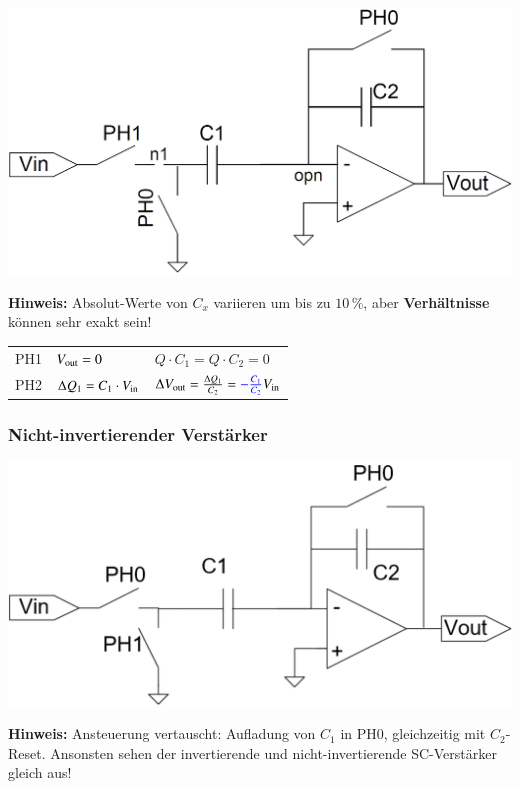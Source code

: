 \begin{minipage}[c]{0.4\columnwidth}
    \includegraphics[width=\columnwidth]{images/invertierender_sc_verstaerker.png}
\end{minipage}
\hfill
\begin{minipage}[c]{0.58\columnwidth}
    \textbf{Hinweis:} Absolut-Werte von $C_x$ variieren um bis zu $10 \, \% $, aber \textbf{Verhältnisse} können sehr exakt sein! 

    \begin{tabular}{@{}l l l@{}} 
        PH1   & $V_{\rm out} = 0$                   & $Q \cdot C_1 = Q \cdot C_2 = 0$ \\
        PH2   & $\Delta Q_1 = C_1 \cdot V_{\rm in}$ & $\Delta V_{\rm out} = \frac{\Delta Q_1}{C_2} = {\color{blue}- \frac{C_1}{C_2}} V_{\rm in}$ \\
    \end{tabular}
\end{minipage}


\subsubsection{Nicht-invertierender Verstärker}

\begin{minipage}[c]{0.4\columnwidth}
    \includegraphics[width=\columnwidth]{images/nicht-invertierender_sc_verstaerker.png}
\end{minipage}
\hfill
\begin{minipage}[c]{0.58\columnwidth}
    \textbf{Hinweis:} Ansteuerung vertauscht: Aufladung von $C_1$ in PH0, gleichzeitig mit $C_2$-Reset. Ansonsten sehen der 
    invertierende und nicht-invertierende SC-Verstärker gleich aus!
\end{minipage}


